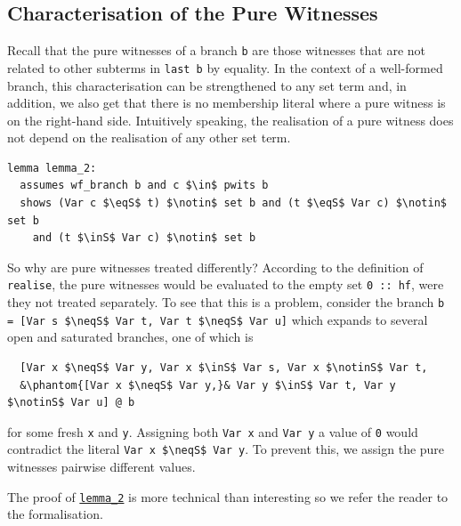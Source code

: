 \documentclass[runningheads]{llncs}
\newcommand{\inS}{\in_\text{s}}
\newcommand{\notinS}{\notin_\text{s}}
\newcommand{\eqS}{=_\text{s}}
\newcommand{\neqS}{\neq_\text{s}}
\begin{document}
\subsection{Characterisation of the Pure Witnesses\label{sec:pwits}}
Recall that the pure witnesses of a branch \lstinline!b! are those witnesses that are not related to other subterms in \lstinline!last b! by equality.
In the context of a well-formed branch, this characterisation can be strengthened to any set term and, in addition, we also get that there is no membership literal where a pure witness is on the right-hand side.
Intuitively speaking, the realisation of a pure witness does not depend on the realisation of any other set term.
\begin{lstlisting}[label={lst:lemma_2}]
lemma lemma_2:
  assumes wf_branch b and c $\in$ pwits b
  shows (Var c $\eqS$ t) $\notin$ set b and (t $\eqS$ Var c) $\notin$ set b
    and (t $\inS$ Var c) $\notin$ set b
\end{lstlisting}
\newcommand{\reflemmatwo}{\hyperref[lst:lemma_2]{\lstinline!lemma_2!}}
So why are pure witnesses treated differently?
According to the definition of \lstinline!realise!, the pure witnesses would be evaluated to the empty set \lstinline!0 :: hf!, were they not treated separately. 
To see that this is a problem, consider the branch
\lstinline!b = [Var s $\neqS$ Var t, Var t $\neqS$ Var u]!
which expands to several open and saturated branches, one of which is
\begin{lstlisting}
  [Var x $\neqS$ Var y, Var x $\inS$ Var s, Var x $\notinS$ Var t,
  &\phantom{[Var x $\neqS$ Var y,}& Var y $\inS$ Var t, Var y $\notinS$ Var u] @ b
\end{lstlisting}
for some fresh \lstinline!x! and \lstinline!y!.
Assigning both \lstinline!Var x! and \lstinline!Var y! a value of \lstinline!0! would contradict the literal \lstinline!Var x $\neqS$ Var y!.
To prevent this, we assign the pure witnesses pairwise different values.

The proof of \reflemmatwo{} is more technical than interesting so we refer the reader to the formalisation.
\end{document}

